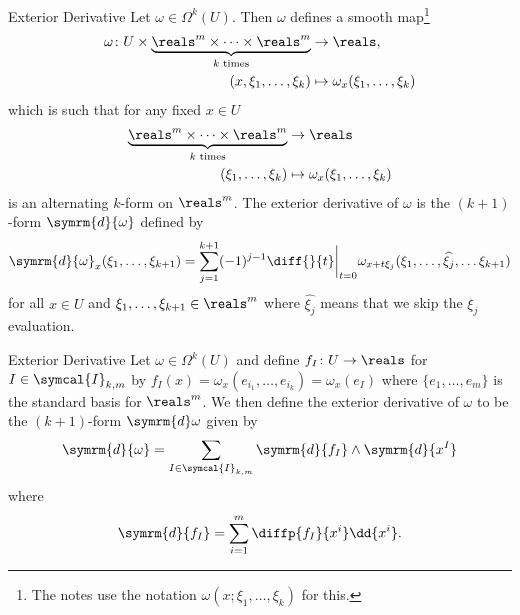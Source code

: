 \documentclass[fleqn]{NotesClass}
\renewcommand{\dl}{\symrm{d}}
\begin{document}
    \begin{dfn}{Exterior Derivative}{}
        Let \(\omega \in \Omega^k(U)\).
        Then \(\omega\) defines a smooth map\footnote{The notes use the notation \(\omega(x; \xi_1, \dotsc, \xi_k)\) for this.}
        \begin{align}
            \omega \colon U \times \underbrace{\reals^m \times \dotsb \times \reals^m}_{k \text{ times}} &\to \reals,\\
            (x, \xi_1, \dotsc, \xi_k) &\mapsto \omega_x(\xi_1, \dotsc, \xi_k)
        \end{align}
        which is such that for any fixed \(x \in U\)
        \begin{align}
            \underbrace{\reals^m \times \dotsb \times \reals^m}_{k \text{ times}} &\to \reals\\
            (\xi_1, \dotsc, \xi_k) &\mapsto \omega_x(\xi_1, \dotsc, \xi_k)
        \end{align}
        is an alternating \(k\)-form on \(\reals^m\).
        The exterior derivative of \(\omega\) is the \((k + 1)\)-form \(\dl{\omega}\) defined by
        \begin{equation}
            \dl{\omega}_x(\xi_1, \dotsc, \xi_{k + 1}) = \sum_{j=1}^{k+1} (-1)^{j-1} \diff{}{t}\bigg|_{t=0} \omega_{x + t\xi_j}(\xi_1, \dotsc, \widehat{\xi_j}, \dotsc \xi_{k+1})
        \end{equation}
        for all \(x \in U\) and \(\xi_1, \dotsc, \xi_{k+1} \in \reals^m\) where \(\widehat{\xi_j}\) means that we skip the \(\xi_j\) evaluation.
    \end{dfn}
    
    \begin{dfn}{Exterior Derivative}{}
        Let \(\omega \in \Omega^k(U)\) and define \(f_I \colon U \to \reals\) for \(I \in \symcal{I}_{k,m}\) by \(f_I(x) = \omega_x(e_{i_1}, \dotsc, e_{i_k}) = \omega_x(e_I)\) where \(\{e_1, \dotsc, e_m\}\) is the standard basis for \(\reals^m\).
        We then define the exterior derivative of \(\omega\) to be the \((k + 1)\)-form \(\dl\omega\) given by
        \begin{equation}
            \dl{\omega} = \sum_{I \in \symcal{I}_{k,m}} \dl{f_I} \wedge \dl{x^I}
        \end{equation}
        where
        \begin{equation}
            \dl{f_I} = \sum_{i=1}^{m} \diffp{f_I}{x^i} \dd{x^i}.
        \end{equation}
    \end{dfn}
    
\end{document}
